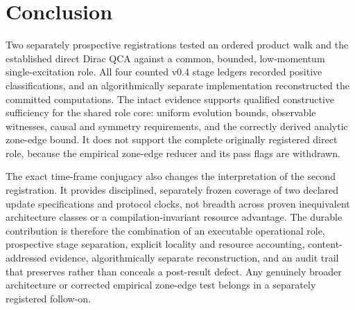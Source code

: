 \section{Conclusion}
\label{sec:conclusion}

Two separately prospective registrations tested an ordered product walk and
the established direct Dirac QCA against a common, bounded, low-momentum
single-excitation role.  All four counted v0.4 stage ledgers recorded positive
classifications, and an algorithmically separate implementation reconstructed
the committed computations.  The intact evidence supports qualified
constructive sufficiency for the shared role core: uniform evolution bounds,
observable witnesses, causal and symmetry requirements, and the correctly
derived analytic zone-edge bound.  It does not support the complete originally
registered direct role, because the empirical zone-edge reducer and its pass
flags are withdrawn.

The exact time-frame conjugacy also changes the interpretation of the second
registration.  It provides disciplined, separately frozen coverage of two
declared update specifications and protocol clocks, not breadth across proven
inequivalent architecture classes or a compilation-invariant resource
advantage.  The durable contribution is therefore the combination of an
executable operational role, prospective stage separation, explicit locality
and resource accounting, content-addressed evidence, algorithmically separate
reconstruction, and an audit trail that preserves rather than conceals a
post-result defect.  Any genuinely broader architecture or corrected empirical
zone-edge test belongs in a separately registered follow-on.
